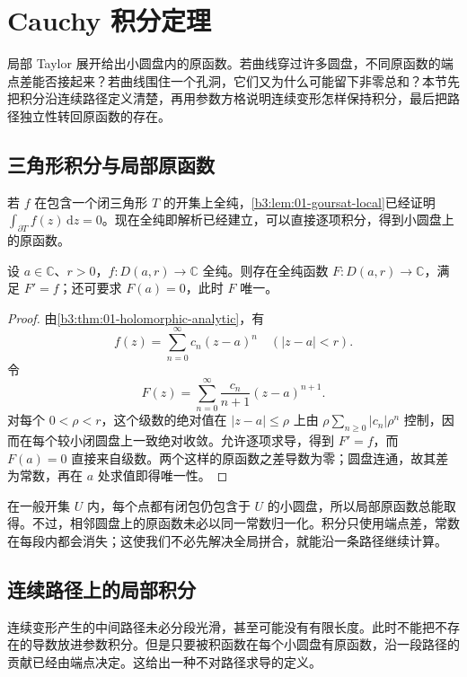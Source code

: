 \section{Cauchy 积分定理}
\label{b3:sec:0202}

局部 Taylor 展开给出小圆盘内的原函数。若曲线穿过许多圆盘，不同原函数的端点差能否接起来？若曲线围住一个孔洞，它们又为什么可能留下非零总和？本节先把积分沿连续路径定义清楚，再用参数方格说明连续变形怎样保持积分，最后把路径独立性转回原函数的存在。

\subsection{三角形积分与局部原函数}
\label{b3:subsec:020201}

若 \(f\) 在包含一个闭三角形 \(T\) 的开集上全纯，\cref{b3:lem:01-goursat-local}已经证明 \(\int_{\partial T}f(z)\,\mathrm{d}z=0\)。现在全纯即解析已经建立，可以直接逐项积分，得到小圆盘上的原函数。

\begin{lemma}[局部原函数]\label{b3:lem:02-local-primitive}
设 \(a\in\mathbb C\)、\(r>0\)，\(f:D(a,r)\to\mathbb C\) 全纯。则存在全纯函数 \(F:D(a,r)\to\mathbb C\)，满足 \(F'=f\)；还可要求 \(F(a)=0\)，此时 \(F\) 唯一。
\end{lemma}
\begin{proof}
由\cref{b3:thm:01-holomorphic-analytic}，有
\[
 f(z)=\sum_{n=0}^{\infty}c_n(z-a)^n
 \quad(|z-a|<r).
\]
令
\[
 F(z)=\sum_{n=0}^{\infty}\frac{c_n}{n+1}(z-a)^{n+1}.
\]
对每个 \(0<\rho<r\)，这个级数的绝对值在 \(|z-a|\le\rho\) 上由
\(\rho\sum_{n\ge0}|c_n|\rho^n\) 控制，因而在每个较小闭圆盘上一致绝对收敛。允许逐项求导，得到 \(F'=f\)，而 \(F(a)=0\) 直接来自级数。两个这样的原函数之差导数为零；圆盘连通，故其差为常数，再在 \(a\) 处求值即得唯一性。
\end{proof}

在一般开集 \(U\) 内，每个点都有闭包仍包含于 \(U\) 的小圆盘，所以局部原函数总能取得。不过，相邻圆盘上的原函数未必以同一常数归一化。积分只使用端点差，常数在每段内都会消失；这使我们不必先解决全局拼合，就能沿一条路径继续计算。

\subsection{连续路径上的局部积分}
\label{b3:subsec:020202}

连续变形产生的中间路径未必分段光滑，甚至可能没有有限长度。此时不能把不存在的导数放进参数积分。但是只要被积函数在每个小圆盘有原函数，沿一段路径的贡献已经由端点决定。这给出一种不对路径求导的定义。

